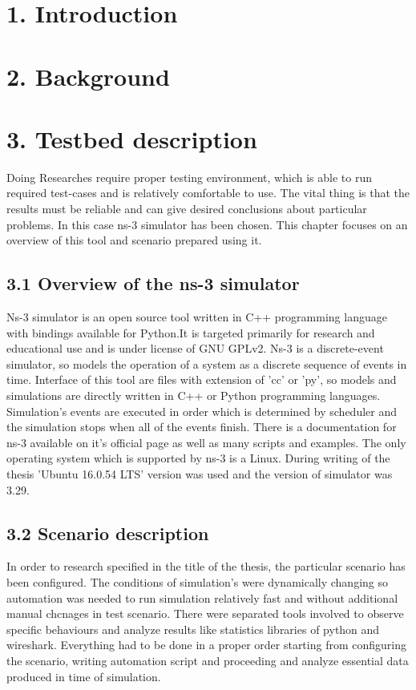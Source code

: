 \newpage\phantom{}
\tableofcontents
\newpage\phantom{}
\section{1. Introduction}
\section{2. Background}
\section{3. Testbed description}
\textnormal{
	\hspace*{0.5cm}Doing Researches require proper testing environment, which is able to run required test-cases and is relatively comfortable to use.
	The vital thing is that the results must be reliable and can give desired conclusions about particular problems. In this case ns-3 simulator has been chosen. This chapter focuses on an overview of this tool and scenario prepared using it.}
\subsection{\hspace*{0.5cm}3.1 Overview of the ns-3 simulator}
\textnormal{\hspace*{0.5cm}Ns-3 simulator is an open source tool written in C++ programming language with bindings available for Python.It is targeted primarily for research and educational use and is under license of GNU GPLv2. Ns-3 is a discrete-event simulator, so models the operation of a system as a discrete sequence of events in time. Interface of this tool are files with extension of 'cc' or 'py', so models and simulations are directly written in C++ or Python programming languages. Simulation's events are executed in order which is determined by scheduler and the simulation stops when all of the events finish. There is a documentation for ns-3 available on it's official page as well as many scripts and examples. The only operating system which is supported by ns-3 is a Linux. During writing of the thesis 'Ubuntu 16.0.54 LTS' version was used and the version of simulator was 3.29.}
\subsection{\hspace*{0.5cm}3.2 Scenario description}

\textnormal{\hspace*{0.5cm}In order to research specified in the title of the thesis, the particular scenario has been configured. The conditions of simulation's were dynamically changing so automation was needed to run simulation relatively fast and without additional manual chcnages in test scenario. There were separated tools involved to observe specific behaviours and analyze results like statistics libraries of python and wireshark. Everything had to be done in a proper order starting from configuring the scenario, writing automation script and proceeding and analyze essential data produced in time of simulation.}
